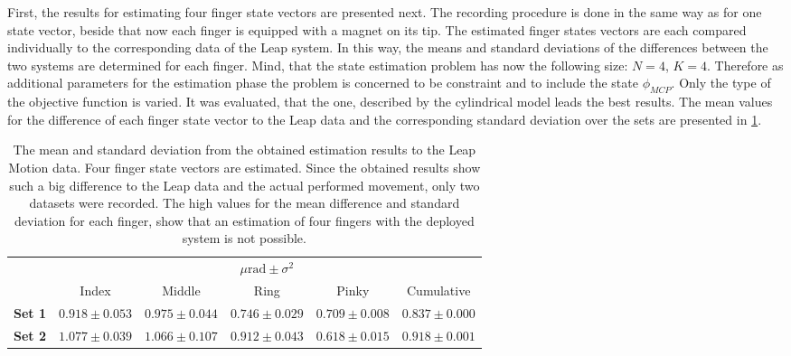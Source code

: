 First, the results for estimating four finger state vectors are presented next. The recording procedure is done in the same way as for one state vector, beside that now each finger is equipped with a magnet on its tip. The estimated finger states vectors are each compared individually to the corresponding data of the Leap system. In this way, the means and standard deviations of the differences between the two systems are determined for each finger. Mind, that the state estimation problem has now the following size: $ N = 4 $, $ K = 4 $. Therefore as additional parameters for the estimation phase the problem is concerned to be constraint and to include the state $ \phi_{MCP} $. Only the type of the objective function is varied. It was evaluated, that the one, described by the cylindrical model leads the best results. The mean values for the difference of each finger state vector to the Leap data and the corresponding standard deviation over the sets are presented in \ref{tab:estSetFour}. 
\begin{table}
\centering
\begin{tabular}{l c c c c c}
\toprule
&  \multicolumn{5}{c}{$ \mu \si{\radian} \pm \sigma^{2} $} \\ \cmidrule{2-6}
& 			   				 Index 				 & Middle 			   & Ring 				 & Pinky 			   &  Cumulative \\ \midrule
\textbf{Set 1} &  $ 0.918 \pm 0.053 $ & $ 0.975 \pm 0.044 $ & $ 0.746 \pm 0.029 $ & $ 0.709 \pm 0.008 $ & $ 0.837 \pm 0.000 $ \\ 
\textbf{Set 2} &  $ 1.077 \pm 0.039 $ & $ 1.066 \pm 0.107 $ & $ 0.912 \pm 0.043 $ & $ 0.618 \pm 0.015 $ & $ 0.918 \pm 0.001 $ \\ \bottomrule
\end{tabular}
\caption[Difference of estimated states, compared to Leap Motion data for four finger estimation]
{The mean and standard deviation from the obtained estimation results to the Leap Motion data. Four finger state vectors are estimated. Since the obtained results show such a big difference to the Leap data and the actual performed movement, only two datasets were recorded. The high values for the mean difference and standard deviation for each finger, show that an estimation of four fingers with the deployed system is not possible.}
\label{tab:estSetFour}
\end{table}
